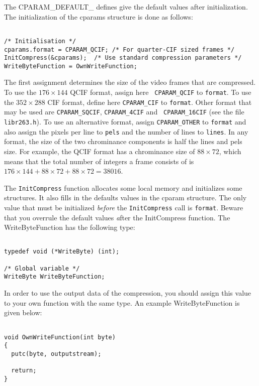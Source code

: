 \documentclass{article}
\begin{document}
The CPARAM\_DEFAULT\_ defines give the default values after
initialization. The initialization of the cparams structure is done
as follows:
\begin{verbatim}

/* Initialisation */
cparams.format = CPARAM_QCIF; /* For quarter-CIF sized frames */
InitCompress(&cparams);  /* Use standard compression parameters */
WriteByteFunction = OwnWriteFunction;

\end{verbatim}

The first assignment determines the size of the video frames that are
compressed. To use the $176 \times 144$ QCIF format, assign here {\tt
  CPARAM\_QCIF} to {\tt format}. To use the $352 \times 288$ CIF
format, define here {\tt CPARAM\_CIF} to {\tt format}. Other format
that may be used are {\tt CPARAM\_SQCIF}, {\tt CPARAM\_4CIF} and {\tt
  CPARAM\_16CIF} (see the file {\tt libr263.h}). To use an
alternative format, assign {\tt CPARAM\_OTHER} to {\tt format} and also
assign the pixels per line to {\tt pels} and the number of lines to
{\tt lines}. In any format, the size of the two chrominance
components is half the {lines} and {pels} size. For example, the QCIF
format has a chrominance size of $88 \times 72$, which means that the
total number of integers a frame consists of is $176 \times 144 + 88
\times 72 + 88 \times 72 = 38016$. 

The {\tt InitCompress} function allocates some local memory and
initializes some structures.  It also fills in the defaults values in
the cparam structure. The only value that must be initialized
\emph{before} the {\tt InitCompress} call is {\tt format}. Beware that
you overrule the default values {\emph after\/} the InitCompress
function.  The WriteByteFunction has the following type:

\begin{verbatim}

typedef void (*WriteByte) (int);

/* Global variable */
WriteByte WriteByteFunction;

\end{verbatim}

In order to use the output data of the compression, you should assign
this value to your own function with the same type. An example
WriteByteFunction is given below:

\begin{verbatim}

void OwnWriteFunction(int byte)
{
  putc(byte, outputstream);

  return;
}
 
\end{verbatim}
\end{document}
